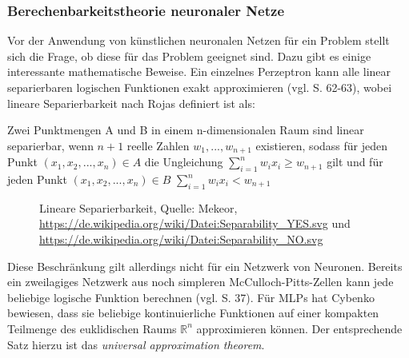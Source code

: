 \documentclass[
	12pt,
	a4paper,
	BCOR10mm,
	DIV14,
	listof=totoc,
	bibliography=totoc,
	headsepline
]{scrreprt}
\begin{document}
\subsubsection{Berechenbarkeitstheorie neuronaler Netze}
Vor der Anwendung von künstlichen neuronalen Netzen für ein Problem stellt sich die Frage, ob diese für das Problem geeignet sind. Dazu gibt es einige interessante mathematische Beweise.
Ein einzelnes Perzeptron kann alle linear separierbaren logischen Funktionen exakt approximieren (vgl. \cite{Rojas:1996:NNS:235222} S. 62-63), wobei lineare Separierbarkeit nach Rojas definiert ist als:

Zwei Punktmengen A und B in einem n-dimensionalen Raum sind linear separierbar, wenn $n + 1$ reelle Zahlen $w_1,...,w_{n+1}$ existieren, sodass für jeden Punkt $(x_1,x_2,...,x_n) \in A$ die Ungleichung $\sum_{i=1}^{n} w_ix_i \ge w_{n+1}$ gilt und für jeden Punkt $(x_1,x_2,...,x_n) \in B$ $\sum_{i=1}^{n} w_ix_i < w_{n+1}$

\begin{figure}
	\hfill
	\caption{Lineare Separierbarkeit, Quelle: Mekeor, \url{https://de.wikipedia.org/wiki/Datei:Separability_YES.svg} und \url{https://de.wikipedia.org/wiki/Datei:Separability_NO.svg}}
	\label{fig:separierbarkeit}
\end{figure} 

Diese Beschränkung gilt allerdings nicht für ein Netzwerk von Neuronen. Bereits ein zweilagiges Netzwerk aus noch simpleren McCulloch-Pitts-Zellen kann jede beliebige logische Funktion berechnen (vgl. \cite{Rojas:1996:NNS:235222} S. 37).
Für MLPs hat Cybenko \cite{cybenko:mcss} bewiesen, dass sie beliebige kontinuierliche Funktionen auf einer kompakten Teilmenge des euklidischen Raums $\mathbb{R}^n$ approximieren können. Der entsprechende Satz hierzu ist das \textit{universal approximation theorem}.
\end{document}
